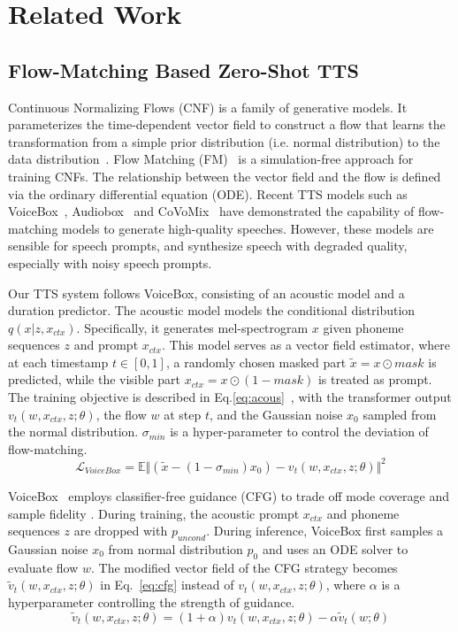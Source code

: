 \section{Related Work}
\subsection{Flow-Matching Based Zero-Shot TTS}
\label{sec:related_work}


Continuous Normalizing Flows (CNF) \cite{chen2018neural} is a family of generative models. It parameterizes the time-dependent vector field to construct a flow that learns the transformation from a simple prior distribution (i.e. normal distribution) to the data distribution~\cite{song2021maximum}. 
Flow Matching (FM)~\cite{lipman2023flow} is a simulation-free approach for training CNFs. The relationship between the vector field and the flow is defined via the ordinary differential
equation (ODE). Recent TTS models such as VoiceBox~\cite{VoiceBox}, Audiobox~\cite{vyas2023audioboxunifiedaudiogeneration} and CoVoMix~\cite{zhang2024covomix}  have demonstrated the capability of flow-matching models to generate high-quality speeches. However, these models are sensible for speech prompts, and synthesize speech with degraded quality, especially with noisy speech prompts. 

Our TTS system follows VoiceBox, consisting of an acoustic model and a duration predictor. The acoustic model models the conditional distribution $q(x | z, x_{ctx})$. Specifically, it generates mel-spectrogram $x$ given phoneme sequences $z$ and prompt $x_{ctx}$.  This model serves as a vector field estimator, where at each timestamp $t \in [0,1]$, a randomly chosen masked part $\tilde{x} = x\odot mask$ is predicted, while the visible part $x_{ctx} = x \odot (1-mask)$ is treated as prompt. 
The training objective is described in Eq.\ref{eq:acous}~\cite{VoiceBox},  with the transformer output $v_t(w, x_{ctx}, z; \theta)$, the flow $w$ at step $t$, and the Gaussian noise $x_0$ sampled from the normal distribution. $\sigma_{min}$ is a hyper-parameter to control the deviation of flow-matching.  
\begin{equation}
    \mathcal{L}_{VoiceBox} = \mathbb{E} \Vert (\tilde{x} - (1 - \sigma_{min})x_0) - v_t(w, x_{ctx}, z ; \theta) \Vert^2
    \label{eq:acous}
\end{equation}

VoiceBox~\cite{VoiceBox} employs classifier-free guidance (CFG) to trade off mode coverage and sample fidelity \cite{VoiceBox,ho2022classifier}. 
During training, the acoustic prompt $x_{ctx}$ and phoneme sequences $z$ are dropped with $p_{uncond}$. During inference, VoiceBox first samples a Gaussian noise $x_0$ from normal distribution $p_0$ and uses an ODE solver to evaluate flow $w$. The modified vector field of the CFG strategy becomes $\tilde{v}_t(w, x_{ctx}, z; \theta)$ in Eq.~\ref{eq:cfg} instead of $v_t(w, x_{ctx}, z; \theta)$, where $\alpha$ is a hyperparameter controlling the strength of guidance. 
\begin{equation}
    \tilde{v}_t(w, x_{ctx}, z ; \theta) = (1 + \alpha) v_t(w, x_{ctx}, z ; \theta) - \alpha \tilde{v}_t(w; \theta)
    \label{eq:cfg}
\end{equation}

